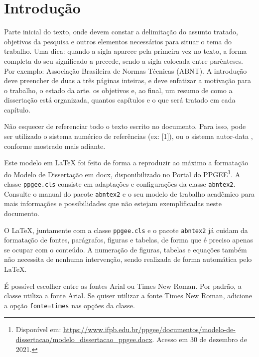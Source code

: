 \chapter{Introdução}

Parte inicial do texto, onde devem constar a delimitação do assunto tratado, objetivos da pesquisa e outros elementos necessários para situar o tema do trabalho. Uma dica: quando a sigla aparece pela primeira vez no texto, a forma completa do seu significado a precede, sendo a sigla colocada entre parênteses. Por exemplo: Associação Brasileira de Normas Técnicas (ABNT). A introdução  deve preencher de duas a três páginas inteiras, e deve enfatizar a motivação para o trabalho, o estado da arte. os objetivos e, ao final, um resumo de como a dissertação está organizada, quantos capítulos e o que será tratado em cada capítulo.

Não esquecer de referenciar todo o texto escrito no documento. Para isso, pode ser utilizado o sistema numérico de referências (ex: [1]), ou o sistema autor-data \cite{NBR6023}, conforme mostrado mais adiante.

Este modelo em \LaTeX{} foi feito de forma a reproduzir ao máximo a formatação do Modelo de Dissertação em docx, disponibilizado no Portal do PPGEE\footnote{Disponível em: \url{https://www.ifpb.edu.br/ppgee/documentos/modelo-de-dissertacao/modelo_dissertacao_ppgee.docx}. Acesso em 30 de dezembro de 2021.}. A classe \texttt{ppgee.cls} consiste em adaptações e configurações da classe \texttt{abntex2}. Consulte o manual do pacote \texttt{abntex2} \cite{abntex2classe} e o seu modelo de trabalho acadêmico \cite{abntex2modelo} para mais informações e possibilidades que não estejam exemplificadas neste documento.

O \LaTeX, juntamente com a classe \texttt{ppgee.cls} e o pacote \texttt{abntex2} já cuidam da formatação de fontes, parágrafos, figuras e tabelas, de forma que é preciso apenas se ocupar com o conteúdo. A numeração de figuras, tabelas e equações também não necessita de nenhuma intervenção, sendo realizada de forma automática pelo \LaTeX.

É possível escolher entre as fontes Arial ou Times New Roman. Por padrão, a classe utiliza a fonte Arial. Se quiser utilizar a fonte Times New Roman, adicione a opção \texttt{fonte=times} nas opções da classe.